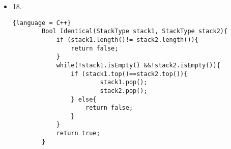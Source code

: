 \documentclass[11pt]{article} %
\begin{document}
\begin{itemize}
    \item 18.\\
    \begin{lstlisting}{language = C++}
        Bool Identical(StackType stack1, StackType stack2){
            if (stack1.length()!= stack2.length()){
                return false;
            }
            while(!stack1.isEmpty() &&!stack2.isEmpty()){
                if (stack1.top()==stack2.top()){
                        stack1.pop();
                        stack2.pop();
                } else{
                    return false;
                }
            }
            return true;
        }
    \end{lstlisting}
    
\end{itemize}
\end{document}
